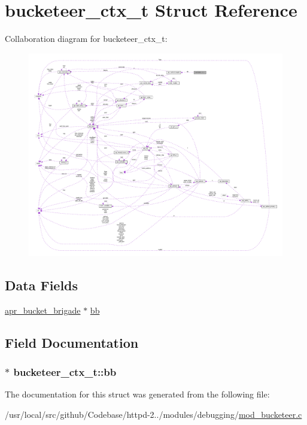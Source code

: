 \hypertarget{structbucketeer__ctx__t}{}\section{bucketeer\+\_\+ctx\+\_\+t Struct Reference}
\label{structbucketeer__ctx__t}


Collaboration diagram for bucketeer\+\_\+ctx\+\_\+t\+:
\nopagebreak
\begin{figure}[H]
\begin{center}
\leavevmode
\includegraphics[width=350pt]{structbucketeer__ctx__t__coll__graph}
\end{center}
\end{figure}
\subsection*{Data Fields}
\begin{DoxyCompactItemize}
\item 
\hyperlink{structapr__bucket__brigade}{apr\+\_\+bucket\+\_\+brigade} $\ast$ \hyperlink{structbucketeer__ctx__t_af41fb60fea4fec7e74605c2da24068d0}{bb}
\end{DoxyCompactItemize}


\subsection{Field Documentation}
\subsubsection[{\texorpdfstring{bb}{bb}}]{$\ast$ bucketeer\+\_\+ctx\+\_\+t\+::bb}\hypertarget{structbucketeer__ctx__t_af41fb60fea4fec7e74605c2da24068d0}{}\label{structbucketeer__ctx__t_af41fb60fea4fec7e74605c2da24068d0}


The documentation for this struct was generated from the following file\+:\begin{DoxyCompactItemize}
\item 
/usr/local/src/github/\+Codebase/httpd-\/2../modules/debugging/\hyperlink{mod__bucketeer_8c}{mod\+\_\+bucketeer.\+c}\end{DoxyCompactItemize}
